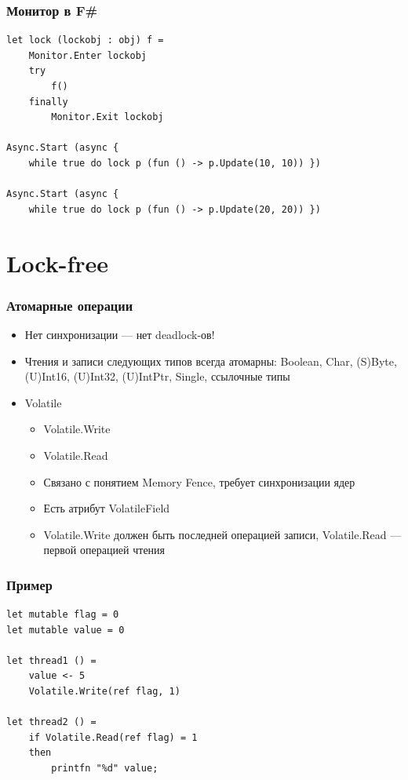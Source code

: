 \documentclass{../../slides-style}
\begin{document}
    \begin{frame}[fragile]
        \frametitle{Монитор в F\#}
        \begin{verbatim}
let lock (lockobj : obj) f =
    Monitor.Enter lockobj
    try
        f()
    finally
        Monitor.Exit lockobj

Async.Start (async { 
    while true do lock p (fun () -> p.Update(10, 10)) })

Async.Start (async { 
    while true do lock p (fun () -> p.Update(20, 20)) })
        \end{verbatim}
    \end{frame}

    \section{Lock-free}

    \begin{frame}
        \frametitle{Атомарные операции}
        \begin{itemize}
            \item Нет синхронизации --- нет deadlock-ов!
            \item Чтения и записи следующих типов всегда атомарны: Boolean, Char, (S)Byte, (U)Int16, (U)Int32, (U)IntPtr, Single, ссылочные типы
            \item Volatile
            \begin{itemize}
                \item Volatile.Write
                \item Volatile.Read
                \item Связано с понятием Memory Fence, требует синхронизации ядер
                \item Есть атрибут VolatileField
                \item Volatile.Write должен быть последней операцией записи, Volatile.Read --- первой операцией чтения
            \end{itemize}
        \end{itemize}
    \end{frame}

    \begin{frame}[fragile]
        \frametitle{Пример}
        \begin{verbatim}
let mutable flag = 0
let mutable value = 0

let thread1 () = 
    value <- 5
    Volatile.Write(ref flag, 1)

let thread2 () =
    if Volatile.Read(ref flag) = 1 
    then
        printfn "%d" value;
        \end{verbatim}
    \end{frame}
\end{document}
